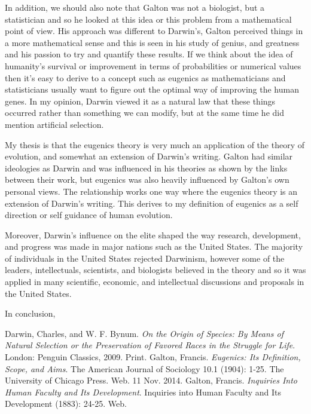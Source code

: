 \documentclass[11pt, oneside]{article}
\begin{document}
\par In addition, we should also note that Galton was not a biologist, but a statistician and so he looked at this idea or this problem from a mathematical point of view. His approach was different to Darwin's, Galton perceived things in a more mathematical sense and this is seen in his study of genius, and greatness and his passion to try and quantify these results. If we think about the idea of humanity's survival or improvement in terms of probabilities or numerical values then it's easy to derive to a concept such as eugenics as mathematicians and statisticians usually want to figure out the optimal way of improving the human genes. In my opinion, Darwin viewed it as a natural law that these things occurred rather than something we can modify, but at the same time he did mention artificial selection.

\par My thesis is that the eugenics theory is very much an application of the theory of evolution, and somewhat an extension of Darwin's writing. Galton had similar ideologies as Darwin and was influenced in his theories as shown by the links between their work, but eugenics was also heavily influenced by Galton's own personal views. The relationship works one way where the eugenics theory is an extension of Darwin's writing. This derives to my definition of eugenics as a self direction or self guidance of human evolution. 

\par Moreover, Darwin's influence on the elite shaped the way research, development, and progress was made in major nations such as the United States. The majority of individuals in the United States rejected Darwinism, however some of the leaders, intellectuals, scientists, and biologists believed in the theory and so it was applied in many scientific, economic, and intellectual discussions and proposals in the United States. 

\par In conclusion, 

\begin{thebibliography}{9}
  Darwin, Charles, and W. F. Bynum.
  \emph{On the Origin of Species: By Means of Natural Selection or the Preservation of Favored Races in the Struggle for Life}.
  London: Penguin Classics, 2009.
  Print.
  Galton, Francis.
  \emph{Eugenics: Its Definition, Scope, and Aims}.
  The American Journal of Sociology 10.1 (1904): 1-25.
  The University of Chicago Press. Web. 11 Nov. 2014.
  Galton, Francis.
  \emph{Inquiries Into Human Faculty and Its Development}.
  Inquiries into Human Faculty and Its Development (1883): 24-25. 
  Web.
\end{thebibliography}
\end{document}
